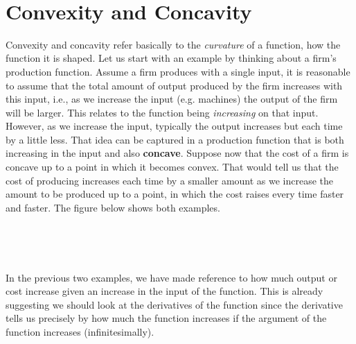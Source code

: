 \documentclass[11pt]{article}
\theoremstyle{definition}
\theoremstyle{plain}
\begin{document}
    \begin{center}
    \end{center}
    { \hspace*{\fill} \\}
    
    \section{Convexity and Concavity}\label{convexity-and-concavity}

Convexity and concavity refer basically to the \emph{curvature} of a
function, how the function it is shaped. Let us start with an example by
thinking about a firm's production function. Assume a firm produces with
a single input, it is reasonable to assume that the total amount of
output produced by the firm increases with this input, i.e., as we
increase the input (e.g. machines) the output of the firm will be
larger. This relates to the function being \emph{increasing} on that
input. However, as we increase the input, typically the output increases
but each time by a little less. That idea can be captured in a
production function that is both increasing in the input and also
\textbf{concave}. Suppose now that the cost of a firm is concave up to a
point in which it becomes convex. That would tell us that the cost of
producing increases each time by a smaller amount as we increase the
amount to be produced up to a point, in which the cost raises every time
faster and faster. The figure below shows both examples.

    \begin{center}
    \end{center}
    { \hspace*{\fill} \\}
    
    \begin{center}
    \end{center}
    { \hspace*{\fill} \\}
    
    In the previous two examples, we have made reference to how much output
or cost increase given an increase in the input of the function. This is
already suggesting we should look at the derivatives of the function
since the derivative tells us precisely by how much the function
increases if the argument of the function increases (infinitesimally).
\end{document}
